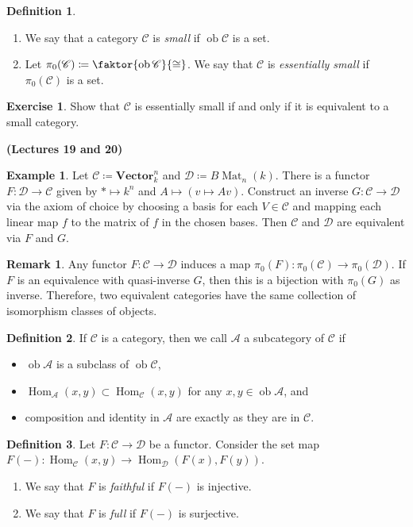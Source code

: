 \documentclass[10pt,letterpaper,cm]{nupset}
\theoremstyle{definition}
\newtheorem*{definition}{Definition}
\newtheorem{exmp}{Example}
\newtheorem{remark}{Remark}
\newtheorem{exercise}{Exercise}
\newcommand{\1}{\mathbf{1}}
\renewcommand{\a}{\mathscr{A}}
\renewcommand{\c}{\mathscr{C}}
\renewcommand{\d}{\mathscr{D}}
\newcommand{\0}{\vec 0}
\DeclareMathOperator{\ob}{ob}
\DeclareMathOperator{\Mat}{Mat}
\DeclareMathOperator{\Hom}{Hom}
\begin{document}
\begin{definition} $ $
\begin{enumerate}
\item We say that a category $\c$ is \textit{small} if $\ob{\c}$ is a set.
\item Let $\pi_0(\c) \coloneqq  \faktor{\ob \c}{\cong}$. We say that $\c$ is \textit{essentially small} if $\pi_0(\c)$ is a set.
\end{enumerate}
\end{definition}

\begin{exercise}
Show that $\c$ is essentially small  if and only if it is equivalent to a small category. 
\end{exercise}

\begin{center}
{\textbf{(Lectures 19 and 20)}}
\end{center}

\begin{exmp} 
Let $\c \coloneqq  \mathbf{Vector}_k^n$ and $\d \coloneqq  B\Mat_n(k)$. There is a functor $F : \d \to \c$ given by $\ast \mapsto k^n$ and $A \mapsto (v \mapsto Av)$. Construct an inverse $G: \c \to \d$ via the axiom of choice by choosing a basis for each $V \in \c$ and mapping each linear map $f$ to the matrix of $f$ in the chosen bases. Then $\c$ and $\d$ are equivalent via $F$ and $G$.
\end{exmp}

\begin{remark}
Any functor $F: \c \to \d$ induces a map $\pi_0(F) : \pi_0(\c) \to \pi_0(\d)$. If $F$ is an equivalence with quasi-inverse $G$, then this is a bijection with $\pi_0(G)$ as inverse. Therefore, two equivalent categories have the same collection of isomorphism classes of objects.
\end{remark}


\begin{definition}
If $\c$ is a category, then we call $\a$ a subcategory of $\c$ if
\begin{itemize}
\item $\ob{\a}$ is a subclass of $\ob{\c}$, 
\item $\Hom_{\a}(x,y) \subset \Hom_{\c}(x,y)$ for any $x,y\in \ob{\a}$, and
\item composition and identity in $\a$ are exactly as they are in $\c$.
\end{itemize}
\end{definition}

\begin{definition} Let $F: \c \to \d$ be a functor. Consider the set map $F({-}): \Hom_{\c}(x,y) \to \Hom_{\d}(F(x), F(y))$.
\begin{enumerate}
\item We say that $F$ is \textit{faithful} if $F({-})$ is injective.
\item We say that $F$ is \textit{full} if $F({-})$ is surjective. 
\end{enumerate}
\end{definition}
\end{document}
